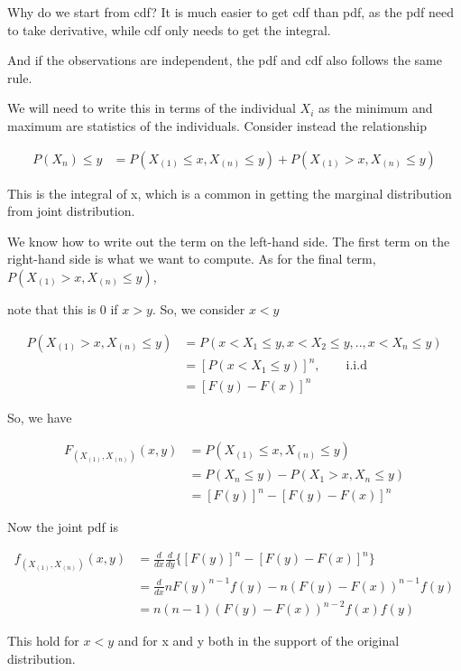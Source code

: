 \documentclass[11pt]{article} %
\begin{document}
Why do we start from cdf? It is much easier to get cdf than pdf, as the pdf need to take derivative, while cdf only needs to get the integral.

And if the observations are independent, the pdf and cdf also follows the same rule. 

We will need to write this in terms of the individual $X_i$ as the minimum and maximum are statistics of the individuals. Consider instead the relationship

\begin{align*}
	P{(X_{n}) \leq y} &= P(X_{(1)} \leq x, X_{(n)} \leq y) + P(X_{(1)} > x, X_{(n)} \leq y)
\end{align*}

This is the integral of x, which is a common in getting the marginal distribution from joint distribution.

We know how to write out the term on the left-hand side. The first term on the right-hand side is what we want to compute. As for the final term, $P(X_{(1)} > x, X_{(n)} \leq y)$,

note that this is 0 if $x > y$. So, we consider $x < y$

\begin{align*}
	P(X_{(1)} > x, X_{(n)} \leq y) &= P(x < X_{1} \leq y, x < X_{2} \leq y, .., x < X_{n} \leq y) \\
	&= [P(x < X_{1} \leq y)]^n, \qquad \text{i.i.d} \\
	&= [F(y)- F(x)]^n
\end{align*}

So, we have 

\begin{align*}
	F_{(X_{(1)}, X_{(n)})} (x,y) &= P(X_{(1)} \leq x, X_{(n)} \leq y) \\
	&= P(X_{n} \leq y) - P(X_{1} > x, X_{n} \leq y) \\
	&= [F(y)]^n - [F(y)- F(x)]^n
\end{align*}

Now the joint pdf is 

\begin{align*}
	f_{(X_{(1)}, X_{(n)})} (x,y) &= \frac{d}{dx} \frac{d}{dy} \{ [F(y)]^n - [F(y)- F(x)]^n\}\\
	&= \frac{d}{dx} n F(y)^{n-1} f(y) - n(F(y)- F(x))^{n-1} f(y) \\
	&= n (n-1) (F(y)- F(x))^{n-2} f(x) f(y)
\end{align*}

This hold for $x < y$ and for x and y both in the support of the original distribution.
\end{document}
